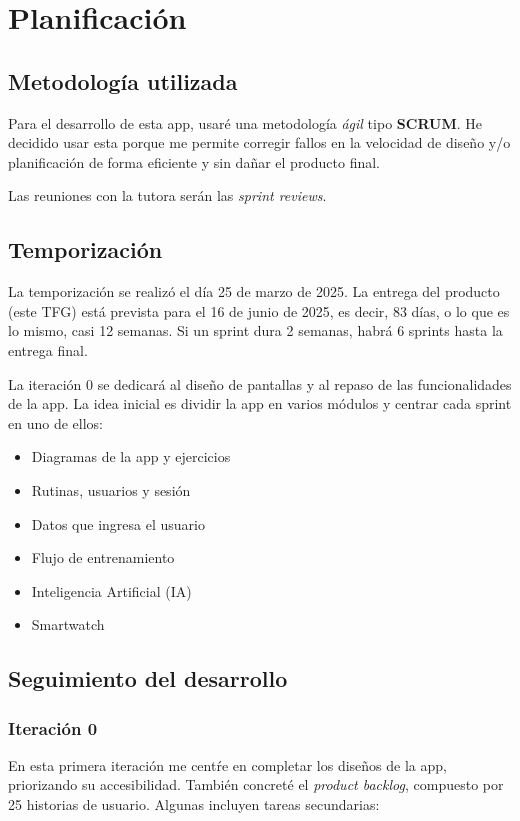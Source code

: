 \chapter{Planificaci\'on}

\section{Metodolog\'ia utilizada}
Para el desarrollo de esta app, usar\'e una metodolog\'ia \textit{\'agil} tipo \textbf{SCRUM}. He decidido usar esta porque me permite corregir fallos en la velocidad de dise\~no y/o planificaci\'on de forma eficiente y sin da\~nar el producto final.

Las reuniones con la tutora ser\'an las \textit{sprint reviews}.

\section{Temporizaci\'on}
La temporizaci\'on se realiz\'o el d\'ia 25 de marzo de 2025. La entrega del producto (este TFG) est\'a prevista para el 16 de junio de 2025, es decir, 83 d\'ias, o lo que es lo mismo, casi 12 semanas. Si un sprint dura 2 semanas, habr\'a 6 sprints hasta la entrega final.

La iteraci\'on 0 se dedicar\'a al dise\~no de pantallas y al repaso de las funcionalidades de la app. La idea inicial es dividir la app en varios m\'odulos y centrar cada sprint en uno de ellos:

\begin{itemize}
  \item Diagramas de la app y ejercicios
  \item Rutinas, usuarios y sesi\'on
  \item Datos que ingresa el usuario
  \item Flujo de entrenamiento
  \item Inteligencia Artificial (IA)
  \item Smartwatch
\end{itemize}

\section{Seguimiento del desarrollo}

\subsection*{Iteraci\'on 0}
En esta primera iteraci\'on me cent\'re en completar los dise\~nos de la app, priorizando su accesibilidad. Tambi\'en concret\'e el \textit{product backlog}, compuesto por 25 historias de usuario. Algunas incluyen tareas secundarias:

